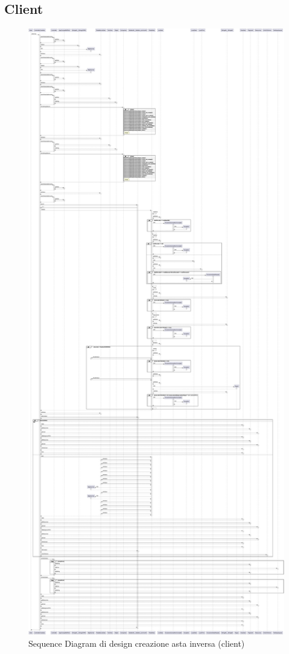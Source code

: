         \subsection{Client}
        \begin{figure}[htbp!]
            \centering
                \includegraphics[width=0.49\linewidth]{Immagini/Diagrammi/Sequence Diagram/Client Sequence Design/ClientSequenceCreaAstaDesign.pdf}
            \caption{Sequence Diagram di design creazione asta inversa (client)}
            \label{fig:Sequence Diagram di design creazione asta inversa (client)}
        \end{figure}
